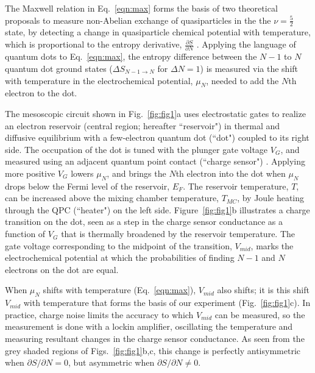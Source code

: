 \documentclass[twocolumn,showpacs,amsmath,amssymb,prl,aps,superscriptaddress]{revtex4-1}
\begin{document}
The Maxwell relation in Eq.~\ref{eqn:max} forms the basis of two theoretical proposals to measure non-Abelian exchange of quasiparticles in the the $\nu = \frac{5}{2}$ state, by detecting a change in quasiparticle chemical potential with temperature, which is proportional to the entropy derivative, $\frac{\partial S}{\partial N}$ \cite{Cooper2009,Ben-Shach2013}. Applying the language of quantum dots to Eq.~\ref{eqn:max}, the entropy difference between the $N-1$ to $N$ quantum dot ground states ($\Delta S_{N-1\rightarrow N}$ for $\Delta N=1$) is measured via the shift with temperature in the electrochemical potential, $\mu_N$, needed to add the $N$th electron to the dot. 

The mesoscopic circuit shown in Fig.~\ref{fig:fig1}a uses electrostatic gates to realize an electron reservoir (central region; hereafter ``reservoir") in thermal and diffusive equilibrium with a few-electron quantum dot (``dot") coupled to its right side.  The occupation of the dot is tuned with the plunger gate voltage $V_G$, and measured using an adjacent quantum point contact (``charge sensor") \cite{Field1993, Staring2007, Thierschmann2015}.  Applying more positive $V_G$ lowers $\mu_N$, and brings the $N$th electron into the dot when $\mu_{N}$ drops below the Fermi level of the reservoir, $E_F$. The reservoir temperature, $T$, can be increased above the mixing chamber temperature, $T_{MC}$, by Joule heating through the QPC (``heater") on the left side.  Figure~\ref{fig:fig1}b illustrates a charge transition on the dot, seen as a step in the charge sensor conductance as a function of $V_G$ that is thermally broadened by the reservoir temperature.  The gate voltage corresponding to the midpoint of the transition, $V_{mid}$, marks the electrochemical potential at which the probabilities of finding $N-1$ and $N$ electrons on the dot are equal.

When $\mu_N$ shifts with temperature (Eq.~\ref{eqn:max}), $V_{mid}$ also shifts; it is this shift $V_{mid}$ with temperature that forms the basis of our experiment (Fig.~\ref{fig:fig1}c).  In practice, charge noise limits the accuracy to which $V_{mid}$ can be measured, so the measurement is done with a lockin amplifier, oscillating the temperature and measuring resultant changes in the charge sensor conductance.  As seen from the grey shaded regions of Figs.~\ref{fig:fig1}b,c, this change is perfectly antisymmetric when $\partial S/\partial N=0$, but asymmetric when $\partial S/\partial N \neq 0$.
\end{document}
